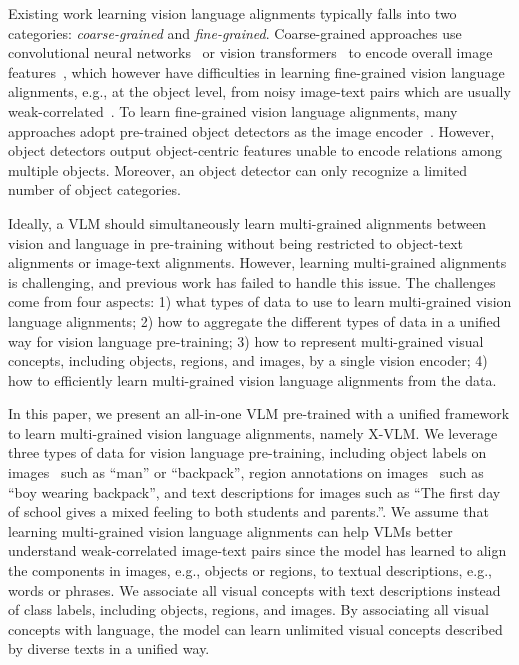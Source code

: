 \documentclass{article}
\newcommand{\baby}{X-VLM\xspace}
\begin{document}
Existing work learning vision language alignments typically falls into two categories: \textit{coarse-grained} and \textit{fine-grained}. Coarse-grained approaches use convolutional neural networks~\cite{he2016deep} or vision transformers~\cite{dosovitskiy2020image} to encode overall image features~\cite{huang2020pixel, kim2021vilt, li2021align}, which however have difficulties in learning fine-grained vision language alignments, e.g., at the object level, from noisy image-text pairs which are usually weak-correlated~\cite{huo2021wenlan}. To learn fine-grained vision language alignments, many approaches adopt pre-trained object detectors as the image encoder~\cite{tan2019lxmert, lu2019vilbert, li2019visualbert, gan2020large, chen2020uniter, li2020oscar, zhang2021vinvl}. However, object detectors output object-centric features unable to encode relations among multiple objects. Moreover, an object detector can only recognize a limited number of object categories.




Ideally, a VLM should simultaneously learn multi-grained alignments between vision and language in pre-training without being restricted to object-text alignments or image-text alignments. However, learning multi-grained alignments is challenging, and previous work has failed to handle this issue. The challenges come from four aspects: 1) what types of data to use to learn multi-grained vision language alignments; 2) how to aggregate the different types of data in a unified way for vision language pre-training; 3) how to represent multi-grained visual concepts, including objects, regions, and images, by a single vision encoder; 4) how to efficiently learn multi-grained vision language alignments from the data.





In this paper, we present an all-in-one VLM pre-trained with a unified framework to learn multi-grained vision language alignments, namely \baby. We leverage three types of data for vision language pre-training, including object labels on images~\cite{lin2014microsoft,shao2019objects365,kuznetsova2018open} such as ``man'' or ``backpack'', region annotations on images~\cite{krishna2016visual,kuznetsova2018open} such as ``boy wearing backpack'', and text descriptions for images such as ``The first day of school gives a mixed feeling to both students and parents.''. We assume that learning multi-grained vision language alignments can help VLMs better understand weak-correlated image-text pairs since the model has learned to align the components in images, e.g., objects or regions, to textual descriptions, e.g., words or phrases. We associate all visual concepts with text descriptions instead of class labels, including objects, regions, and images. By associating all visual concepts with language, the model can learn unlimited visual concepts described by diverse texts in a unified way.
\end{document}
